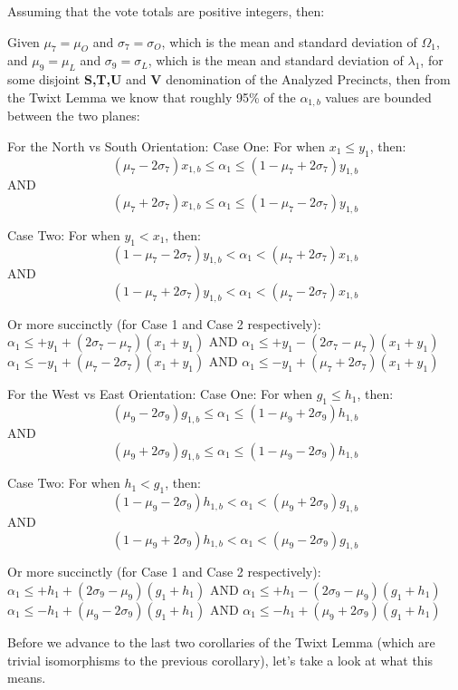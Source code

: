 \begin{corollary}
Assuming that the vote totals are positive integers, then:

Given $\mu_{7}=\mu_{O}$ and $\sigma_{7}=\sigma_{O}$, which is the mean and standard deviation of $\Omega_{1}$, and $\mu_{9}=\mu_{L}$ and $\sigma_{9}=\sigma_{L}$, which is the mean and standard deviation of $\lambda_{1}$, for some disjoint \textbf{S,T,U} and \textbf{V} denomination of the Analyzed Precincts, then from the Twixt Lemma we know that roughly 95\% of the $\alpha_{1,b}$ values are bounded between the two planes:

For the North vs South Orientation:
Case One:  For when $x_{1} \le y_{1}$, then:
$$(\mu_{7}-2\sigma_{7})x_{1,b} \le \alpha_{1} \le (1-\mu_{7}+2\sigma_{7})y_{1,b}$$
AND
$$(\mu_{7}+2\sigma_{7})x_{1,b} \le \alpha_{1} \le (1-\mu_{7}-2\sigma_{7})y_{1,b}$$

Case Two: For when $y_{1} < x_{1}$, then:
$$(1-\mu_{7}-2\sigma_{7})y_{1,b} < \alpha_{1} < (\mu_{7}+2\sigma_{7})x_{1,b}$$
AND
$$(1-\mu_{7}+2\sigma_{7})y_{1,b} < \alpha_{1} < (\mu_{7}-2\sigma_{7})x_{1,b}$$

Or more succinctly (for Case 1 and Case 2 respectively):\\
$\alpha_{1} \le +y_{1}+(2\sigma_{7}-\mu_{7})(x_{1}+y_{1})$ AND $\alpha_{1} \le +y_{1}-(2\sigma_{7}-\mu_{7})(x_{1}+y_{1})$\\
$\alpha_{1} \le -y_{1}+(\mu_{7}-2\sigma_{7})(x_{1}+y_{1})$ AND $\alpha_{1} \le -y_{1}+(\mu_{7}+2\sigma_{7})(x_{1}+y_{1})$

For the West vs East Orientation:
Case One:  For when $g_{1} \le h_{1}$, then:
$$(\mu_{9}-2\sigma_{9})g_{1,b} \le \alpha_{1} \le (1-\mu_{9}+2\sigma_{9})h_{1,b}$$
AND
$$(\mu_{9}+2\sigma_{9})g_{1,b} \le \alpha_{1} \le (1-\mu_{9}-2\sigma_{9})h_{1,b}$$

Case Two: For when $h_{1} < g_{1}$, then:
$$(1-\mu_{9}-2\sigma_{9})h_{1,b} < \alpha_{1} < (\mu_{9}+2\sigma_{9})g_{1,b}$$
AND
$$(1-\mu_{9}+2\sigma_{9})h_{1,b} < \alpha_{1} < (\mu_{9}-2\sigma_{9})g_{1,b}$$

Or more succinctly (for Case 1 and Case 2 respectively):\\
$\alpha_{1} \le +h_{1}+(2\sigma_{9}-\mu_{9})(g_{1}+h_{1})$ AND $\alpha_{1} \le +h_{1}-(2\sigma_{9}-\mu_{9})(g_{1}+h_{1})$\\
$\alpha_{1} \le -h_{1}+(\mu_{9}-2\sigma_{9})(g_{1}+h_{1})$ AND $\alpha_{1} \le -h_{1}+(\mu_{9}+2\sigma_{9})(g_{1}+h_{1})$
\end{corollary}
\newpage
Before we advance to the last two corollaries of the Twixt Lemma (which are trivial isomorphisms to the previous corollary), let's take a look at what this means.

